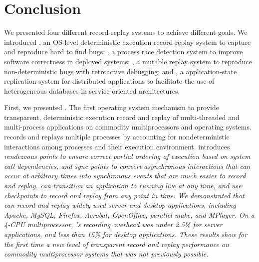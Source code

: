 \chapter{Conclusion}
\label{ch:conclusion}

We presented four different record-replay systems to achieve different goals.
We introduced \scribe, an OS-level deterministic execution record-replay system
to capture and reproduce hard to find bugs; \racepro, a process race detection
system to improve software correctness in deployed systems; \dora, a mutable
replay system to reproduce non-deterministic bugs with retroactive debugging;
and \synapse, a application-state replication system for distributed
applications to facilitate the use of heterogeneous databases in
service-oriented architectures.

First, we presented \scribe. The first operating system mechanism to provide transparent,
deterministic execution record and replay of multi-threaded and multi-process
applications on commodity multiprocessors and operating systems.  \scribe
records and replays multiple processes by accounting for nondeterministic
interactions among processes and their execution environment.  \scribe
introduces \em{rendezvous} points to ensure correct partial ordering of execution
based on system call dependencies, and \em{sync points} to convert asynchronous
interactions that can occur at arbitrary times into synchronous events that are
much easier to record and replay.  \scribe{} can transition an application to
running live at any time, and use checkpoints to record and replay from any
point in time.
We demonstrated that \scribe can record and replay widely used server and
desktop applications, including Apache, MySQL, Firefox, Acrobat, OpenOffice,
parallel make, and MPlayer.  On a 4-CPU multiprocessor, \scribe{}'s recording
overhead was under 2.5\% for server applications, and less than 15\% for desktop
applications.  These results show for the first time a new level of transparent
record and replay performance on commodity multiprocessor systems that was not
previously possible. 


